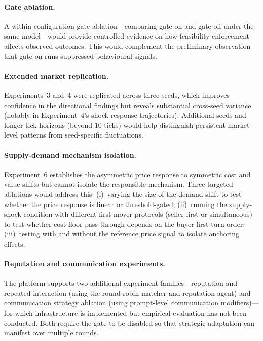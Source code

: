 \paragraph{Gate ablation.}
A within-configuration gate ablation---comparing gate-on and gate-off under the same model---would provide controlled evidence on how feasibility enforcement affects observed outcomes.  This would complement the preliminary observation that gate-on runs suppressed behavioural signals.

\paragraph{Extended market replication.}
Experiments~3 and~4 were replicated across three seeds, which improves confidence in the directional findings but reveals substantial cross-seed variance (notably in Experiment~4's shock response trajectories).  Additional seeds and longer tick horizons (beyond 10 ticks) would help distinguish persistent market-level patterns from seed-specific fluctuations.

\paragraph{Supply-demand mechanism isolation.}
Experiment~6 establishes the asymmetric price response to symmetric cost and value shifts but cannot isolate the responsible mechanism.  Three targeted ablations would address this: (i)~varying the size of the demand shift to test whether the price response is linear or threshold-gated; (ii)~running the supply-shock condition with different first-mover protocols (seller-first or simultaneous) to test whether cost-floor pass-through depends on the buyer-first turn order; (iii)~testing with and without the reference price signal to isolate anchoring effects.

\paragraph{Reputation and communication experiments.}
The platform supports two additional experiment families---reputation and repeated interaction (using the round-robin matcher and reputation agent) and communication strategy ablation (using prompt-level communication modifiers)---for which infrastructure is implemented but empirical evaluation has not been conducted.  Both require the gate to be disabled so that strategic adaptation can manifest over multiple rounds.

